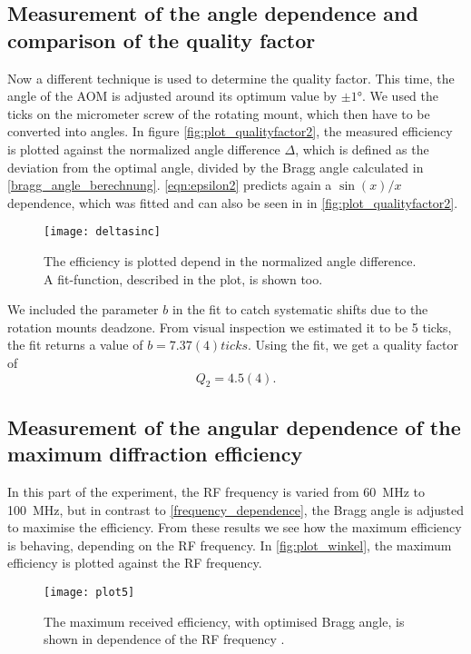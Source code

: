 \subsection{Measurement of the angle dependence and comparison of the quality factor}
Now a different technique is used to determine the quality factor. This time, the angle of the AOM is adjusted around its optimum value by $\pm\ang{1}$. We used the ticks on the micrometer screw of the rotating mount, which then have to be converted into angles. 
In figure \autoref{fig:plot_qualityfactor2}, the measured efficiency is plotted against the normalized angle difference $\Delta$, which is defined as the deviation from the optimal angle, divided by the Bragg angle calculated in \autoref{bragg_angle_berechnung}. \autoref{eqn:epsilon2} predicts again a $\sin(x)/x$ dependence, which was fitted and can also be seen in in \autoref{fig:plot_qualityfactor2}.
\begin{figure}[H]
	\centering
	\texttt{[image: deltasinc]}
	\caption{The efficiency is plotted depend in the normalized angle difference. A fit-function, described in the plot, is shown too. } 
	\label{fig:plot_qualityfactor2}
\end{figure}
We included the parameter $b$ in the fit to catch systematic shifts due to the rotation mounts deadzone. From visual inspection we estimated it to be 5 ticks, the fit returns a value of $b = 7.37(4) \unit{ticks}$.
Using the fit, we get a quality factor of
$$Q_2 =  4.5(4).$$


\subsection{Measurement of the angular dependence of the maximum diffraction efficiency}
In this part of the experiment, the RF frequency is varied from \SI{60}{MHz} to \SI{100}{MHz}, but in contrast to \autoref{frequency_dependence}, the Bragg angle is adjusted to maximise the efficiency. From these results we see how the maximum efficiency is behaving, depending on the RF frequency. In \autoref{fig:plot_winkel}, the maximum efficiency is plotted against the RF frequency. 
\begin{figure}[H]
	\centering
	\texttt{[image: plot5]}
	\caption{The maximum received efficiency, with optimised Bragg angle, is shown in dependence of the RF frequency \frf. } 
	\label{fig:plot_winkel}
\end{figure}